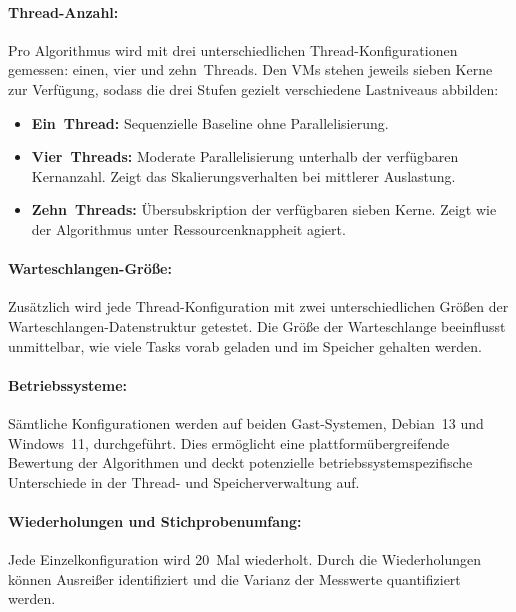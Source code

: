 \begin{sloppypar}
\paragraph{Thread-Anzahl:}
Pro Algorithmus wird mit drei unterschiedlichen Thread-Konfigurationen gemessen: einen, vier und zehn~Threads.
Den VMs stehen jeweils sieben Kerne zur Verfügung, sodass die drei Stufen gezielt verschiedene Lastniveaus abbilden:
\begin{itemize}
    \item \textbf{Ein~Thread:} Sequenzielle Baseline ohne Parallelisierung.
    \item \textbf{Vier~Threads:} Moderate Parallelisierung unterhalb der verfügbaren Kernanzahl.
    Zeigt das Skalierungsverhalten bei mittlerer Auslastung.
    \item \textbf{Zehn~Threads:} Übersubskription der verfügbaren sieben Kerne.
    Zeigt wie der Algorithmus unter Ressourcenknappheit agiert.
\end{itemize}

\paragraph{Warteschlangen-Größe:}
Zusätzlich wird jede Thread-Konfiguration mit zwei unterschiedlichen Größen der Warteschlangen-Datenstruktur getestet.
Die Größe der Warteschlange beeinflusst unmittelbar, wie viele Tasks vorab geladen und im Speicher gehalten werden.

\paragraph{Betriebssysteme:}
Sämtliche Konfigurationen werden auf beiden Gast-Systemen, Debian~13 und Windows~11, durchgeführt.
Dies ermöglicht eine plattformübergreifende Bewertung der Algorithmen und deckt potenzielle
betriebssystemspezifische Unterschiede in der Thread- und Speicherverwaltung auf.

\paragraph{Wiederholungen und Stichprobenumfang:}
Jede Einzelkonfiguration wird 20~Mal wiederholt.
Durch die Wiederholungen können Ausreißer identifiziert und die Varianz der Messwerte quantifiziert werden.


\end{sloppypar}
